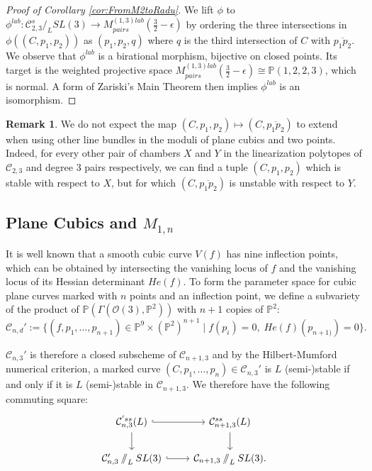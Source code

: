 \documentclass{amsart}
\newcommand{\Pj}{\mathbb{P}}
\newcommand{\mc}{\mathcal}
\newcommand{\sslash}{\mathbin{/\mkern-6mu/}}
\numberwithin{equation}{section}
\theoremstyle{definition}
\newtheorem{rmk}[prop]{Remark}
\begin{document}
\begin{proof}[Proof of Corollary \ref{cor:FromM2toRadu}]
    We lift $\phi$ to $\phi^{lab}: \mc{C}_{2,3}^s \slash_L SL(3) \rightarrow M^{(1,3)lab}_{pairs}(\frac{3}{2}- \epsilon)$ by ordering the three intersections in $\phi((C,p_1, p_2))$ as $(p_1, p_2, q)$ where $q$ is the third intersection of $C$ with $\overline{p_1p_2}$. We observe that $\phi^{lab}$ is a birational morphism, bijective on closed points. Its target is the weighted projective space $ M^{(1,3)lab}_{pairs}(\frac{3}{2}- \epsilon) \cong \mathbb{P}(1,2,2,3)$, which is normal. A form of Zariski's Main Theorem \cite[Corollary 12.88]{Gortz10}
    then implies $\phi^{lab}$ is an isomorphism.
\end{proof}

\begin{rmk}
We do not expect the map $(C, p_1, p_2) \mapsto (C, \overline{p_1p_2})$ to extend when using other line bundles in the moduli of plane cubics and two points. Indeed, for every other pair of chambers $X$ and $Y$ in the linearization polytopes of $\mc{C}_{2,3}$ and degree $3$ pairs respectively, we can find a tuple $(C, p_1, p_2) $ which is stable with respect to $X$, but for which $(C, \overline{p_1p_2})$ is unstable with respect to $Y$.
\end{rmk}

\subsection{Plane Cubics and \texorpdfstring{$M_{1,n}$}{M1,n}} \label{sec:planecubicsM1n}
It is well known that a smooth cubic curve $ V (f) $ has nine 
inflection points, which can be obtained by intersecting the vanishing locus of $f$ and the vanishing locus of its Hessian determinant $He(f)$. To form the parameter space for cubic plane curves marked with $n$ 
points and an inflection point, we define a subvariety of the product of $\Pj(\Gamma(\mc{O}(3),\Pj^2))$ with $n+1$ copies of $\Pj^2$:
$$\mc{C}_{n,d}' :=\{
(f, p_1, \ldots, p_{n+1}) \in \mathbb{P}^9 \times (\mathbb{P}^2)^{n+1} \; | \;
f(p_i)=0, \; He(f)(p_{n+1)}) =0 \}.
$$

 $\mc{C}_{n,3}'$ is therefore a closed subscheme of $\mc{C}_{n+1,3}$ and by the Hilbert-Mumford numerical criterion, a marked curve $(C, p_1, \dots , p_n) \in \mc{C}_{n,3}'$ is $L$ (semi-)stable if and only if it is $L$ (semi-)stable in $\mc{C}_{n+1,3}$. We therefore have the following commuting square:
$$
\begin{tikzcd}
    \mc{C}_{n,3}^{' ss}(L) \arrow[r, hook] \arrow[d] & \mc{C}_{n+1,3}^{ss}(L) \arrow[d] \\
    \mc{C}_{n,3}' \sslash_L SL(3) \arrow[r, hook] & \mc{C}_{n+1,3} \sslash_L SL(3) .
\end{tikzcd}
$$
\end{document}
